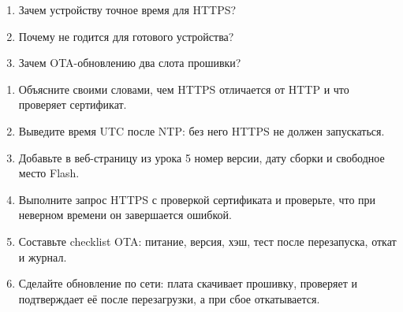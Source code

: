 \begin{selfcheck}
\begin{enumerate}
  \item Зачем устройству точное время для HTTPS?
  \item Почему  не годится для готового устройства?
  \item Зачем OTA-обновлению два слота прошивки?
\end{enumerate}
\end{selfcheck}

\begin{tasks}
\begin{enumerate}
\item {} Объясните своими словами, чем HTTPS отличается от HTTP и что проверяет сертификат.
\item {} Выведите время UTC после NTP: без него HTTPS не должен запускаться.
\item {} Добавьте в веб-страницу из урока 5 номер версии, дату сборки и свободное место Flash.
\item {} Выполните запрос HTTPS с проверкой сертификата и проверьте, что при неверном времени он завершается ошибкой.
\item {} Составьте checklist OTA: питание, версия, хэш, тест после перезапуска, откат и журнал.
\item {} Сделайте обновление по сети: плата скачивает прошивку, проверяет и подтверждает её после перезагрузки, а при сбое откатывается.
\end{enumerate}
\end{tasks}
